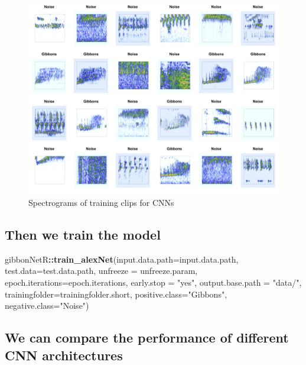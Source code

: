 \documentclass[fleqn,10pt,lineno]{wlpeerj} %
\newenvironment{Shaded}{\begin{snugshade}}{\end{snugshade}}
\newcommand{\AttributeTok}[1]{\textcolor[rgb]{0.13,0.29,0.53}{#1}}
\newcommand{\FunctionTok}[1]{\textcolor[rgb]{0.13,0.29,0.53}{\textbf{#1}}}
\newcommand{\NormalTok}[1]{#1}
\newcommand{\SpecialCharTok}[1]{\textcolor[rgb]{0.81,0.36,0.00}{\textbf{#1}}}
\newcommand{\StringTok}[1]{\textcolor[rgb]{0.31,0.60,0.02}{#1}}
\begin{document}
\begin{figure}[H]
\includegraphics[width=0.75\linewidth]{../../README_files/spectro} \caption{Spectrograms of training clips for CNNs}\label{fig:unnamed-chunk-1}
\end{figure}

\hypertarget{then-we-train-the-model}{%
\subsection{Then we train the model}\label{then-we-train-the-model}}

\begin{Shaded}
\begin{Highlighting}[]
\NormalTok{gibbonNetR}\SpecialCharTok{::}\FunctionTok{train\_alexNet}\NormalTok{(}\AttributeTok{input.data.path=}\NormalTok{input.data.path,}
                          \AttributeTok{test.data=}\NormalTok{test.data.path,}
                          \AttributeTok{unfreeze =}\NormalTok{ unfreeze.param,}
                          \AttributeTok{epoch.iterations=}\NormalTok{epoch.iterations,}
                          \AttributeTok{early.stop =} \StringTok{"yes"}\NormalTok{,}
                          \AttributeTok{output.base.path =} \StringTok{"data/"}\NormalTok{,}
                          \AttributeTok{trainingfolder=}\NormalTok{trainingfolder.short,}
                          \AttributeTok{positive.class=}\StringTok{"Gibbons"}\NormalTok{,}
                          \AttributeTok{negative.class=}\StringTok{"Noise"}\NormalTok{)}
\end{Highlighting}
\end{Shaded}

\hypertarget{we-can-compare-the-performance-of-different-cnn-architectures}{%
\subsection{We can compare the performance of different CNN
architectures}\label{we-can-compare-the-performance-of-different-cnn-architectures}}
\end{document}
